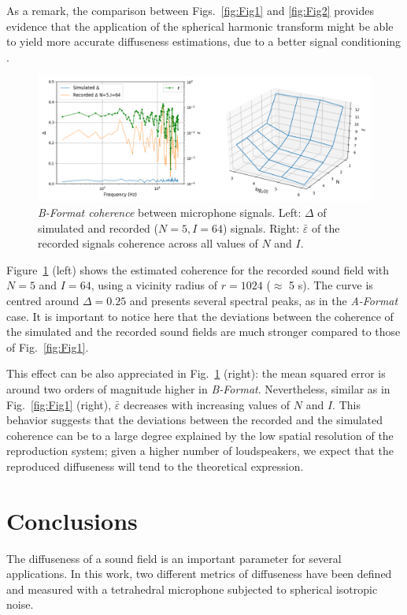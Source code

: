 As a remark, the comparison between Figs.~\ref{fig:Fig1} and \ref{fig:Fig2} provides evidence that the application of the spherical harmonic transform might be able to yield more accurate diffuseness estimations, due to a better signal conditioning \cite{epain2016spherical}.\\


\begin{figure}
	\includegraphics[width=\textwidth]{Figures/CoherenceEstimation/Untitled2}
	\caption{\label{fig:Fig3}\textit{B-Format coherence} between microphone signals. Left: $\Delta$ of simulated and recorded ($N=5, I=64$) signals. Right: $\bar{\varepsilon}$ of the recorded signals coherence across all values of $N$ and $I$.}
\end{figure}

Figure~\ref{fig:Fig3} (left) shows the estimated coherence for the recorded sound field with $N=5$ and $I=64$, using a vicinity radius of $r=1024$ ($\approx$ 5 s).
The curve is centred around $\Delta=0.25$ and presents several spectral peaks, as in the \textit{A-Format} case. 
It is important to notice here that the deviations between the coherence of the simulated and the recorded sound fields are much stronger compared to those of Fig.~\ref{fig:Fig1}. 

This effect can be also appreciated in Fig.~\ref{fig:Fig3} (right): the mean squared error is around two orders of magnitude higher in \textit{B-Format}.
Nevertheless, similar as in Fig.~\ref{fig:Fig1} (right), $\bar{\varepsilon}$ decreases with increasing values of $N$ and $I$.
This behavior suggests that the deviations between the recorded and the simulated coherence can be to a large degree explained by the low spatial resolution of the reproduction system; given a higher number of loudspeakers, we expect that the reproduced diffuseness will tend to the theoretical expression.




\section{Conclusions}
The diffuseness of a sound field is an important parameter for several applications. In this work, two different metrics of diffuseness have been defined and measured with a tetrahedral microphone subjected to spherical isotropic noise.


